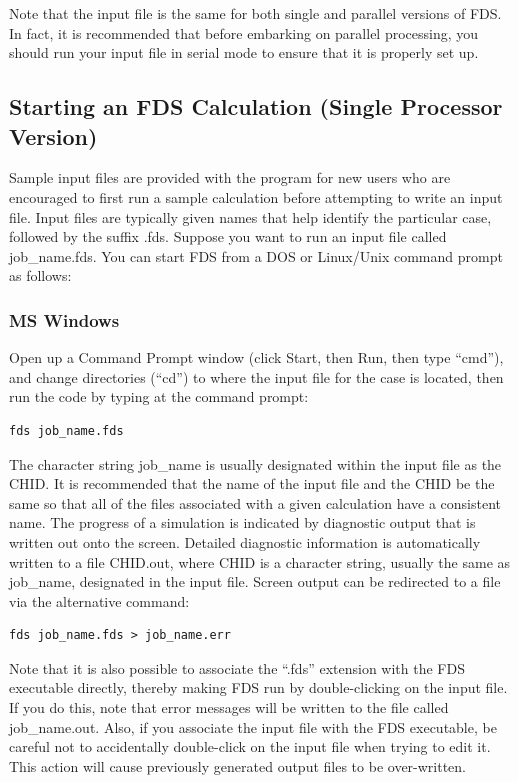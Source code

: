 \documentclass[11pt]{book}
\begin{document}
Note that the input file is the same for both single and parallel versions of FDS. In fact, it is recommended that before embarking on parallel processing, you should run your input file in serial mode to ensure that it is properly set up.



\subsection{Starting an FDS Calculation (Single Processor Version)}

Sample input files are provided with the program for new users who are encouraged to first run a sample calculation before attempting to write an input file. Input files are typically given names that help identify the particular case, followed by the suffix {\ct .fds}. Suppose you want to run an input file called {\ct job\_name.fds}. You can start FDS from a DOS or Linux/Unix command prompt as follows:


\subsubsection{MS Windows}

Open up a Command Prompt window (click Start, then Run, then type ``cmd''), and change directories (``cd'') to where the
input file for the case is located, then run the code by typing at the command prompt:
\begin{lstlisting}
fds job_name.fds
\end{lstlisting}
The character string {\ct job\_name} is usually designated within
the input file as the {\ct CHID}. It is recommended that the name
of the input file and the {\ct CHID} be the same so that all of
the files associated with a given calculation have a consistent
name.  The progress of a simulation is indicated by diagnostic
output that is written out onto the screen. Detailed diagnostic
information is automatically written to a file {\ct CHID.out},
where {\ct CHID} is a character string, usually the same as {\ct
job\_name}, designated in the input file. Screen output can be
redirected to a file via the alternative command:
\begin{lstlisting}
fds job_name.fds > job_name.err
\end{lstlisting}
Note that it is also possible to associate the ``.fds'' extension with the FDS executable directly, thereby making FDS run by
double-clicking on the input file. If you do this, note that error messages will be written to the file called {\ct job\_name.out}. Also, if you
associate the input file with the FDS executable, be careful not to accidentally double-click on the input file when trying to edit it.
This action will cause previously generated output files to be over-written.
\end{document}

